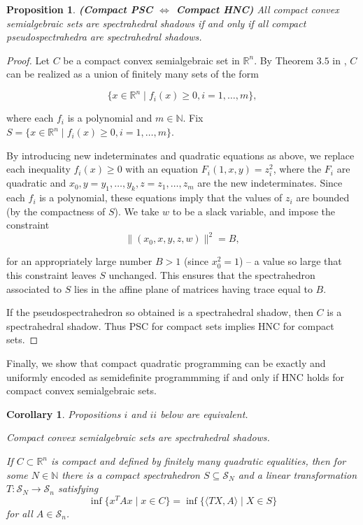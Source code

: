 \documentclass[11pt]{article} %
\newtheorem{prop}[thm]{Proposition}
\newtheorem{cor}[thm]{Corollary}
\newcommand{\R}{\mathbb{R}}
\newcommand{\N}{\mathbb{N}}
\newcommand{\s}{\mathcal{S}}
\newcounter{qcounter}
\begin{document}
\begin{prop}{\bf(\emph {Compact PSC $\Leftrightarrow$ Compact HNC})}
All compact convex semialgebraic sets are spectrahedral shadows if and only if all compact pseudospectrahedra are spectrahedral shadows.
\label{compactPSC}
\end{prop}
\begin{proof}
Let $C$ be a compact convex semialgebraic set in $\R^n$. By Theorem $3.5$ in \cite{HeltSuff}, $C$ can be realized as a union of finitely many sets of the form

\[ \{x \in \R^n \mid f_i(x) \geq 0, i = 1,\ldots,m\},\]

where each $f_i$ is a polynomial and $m \in \N$. Fix $S = \{x \in \R^n \mid f_i(x) \geq 0, i = 1,\ldots,m\}$.

By introducing new indeterminates and quadratic equations as above, we replace each inequality $f_i(x) \geq 0$ with an equation $F_i(1,x,y) = z_i^2$, where the $F_i$ are quadratic and $x_0,y = y_1,\ldots,y_k,z = z_1,\ldots,z_m$ are the new indeterminates. Since each $f_i$ is a polynomial, these equations imply that the values of $z_i$ are bounded (by the compactness of $S$). We take $w$ to be a slack variable, and impose the constraint
\[\|(x_0,x,y,z,w)\|^2 = B,\] 

for an appropriately large number $B>1$ (since $x_0^2 = 1$) -- a value so large that this constraint leaves $S$ unchanged. This ensures that the spectrahedron associated to $S$ lies in the affine plane of matrices having trace equal to $B$. 

If the pseudospectrahedron so obtained is a spectrahedral shadow, then $C$ is a spectrahedral shadow. Thus PSC for compact sets implies HNC for compact sets.
\end{proof}
Finally, we show that compact quadratic programming can be exactly and uniformly encoded as semidefinite programmming if and only if HNC holds for compact convex semialgebraic sets. 
\begin{cor}
Propositions $i$ and $ii$ below are equivalent.
\begin{list}{)}{}
\item Compact convex semialgebraic sets are spectrahedral shadows. 
\item If $C\subset \R^n$ is compact and defined by finitely many quadratic equalities, then for some $N \in \N$ there is a compact spectrahedron $S\subseteq \s_N$ and a linear transformation $T: \s_N \to \s_n$ satisfying 
\[ \inf\{ x^TAx \mid x \in C \} = \inf \{\langle TX, A \rangle \mid X \in S\} \]
for all $A \in \s_ n$.
\end{list}
\end{cor}
\end{document}
